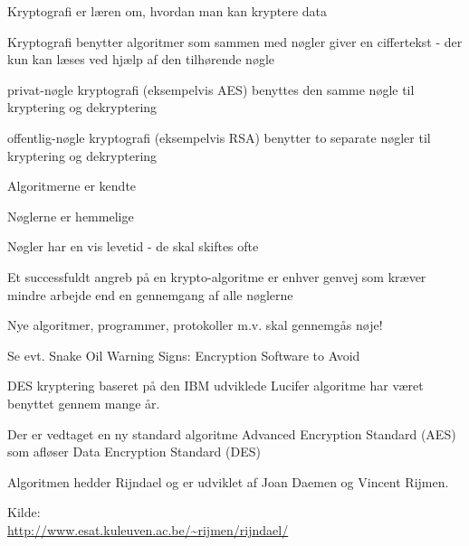

\begin{list1}
\item Kryptografi er læren om, hvordan man kan kryptere data
\item Kryptografi benytter algoritmer som sammen med nøgler giver en
  ciffertekst - der kun kan læses ved hjælp af den tilhørende nøgle
\item privat-nøgle kryptografi (eksempelvis AES) benyttes den samme
  nøgle til kryptering og dekryptering 
\item offentlig-nøgle kryptografi (eksempelvis RSA) benytter to
  separate nøgler til kryptering og dekryptering
\end{list1}



\begin{list1}
\item Algoritmerne er kendte
\item Nøglerne er hemmelige
\item Nøgler har en vis levetid - de skal skiftes ofte
\item Et successfuldt angreb på en krypto-algoritme er enhver genvej
  som kræver mindre arbejde end en gennemgang af alle nøglerne 
\item Nye algoritmer, programmer, protokoller m.v. skal gennemgås nøje!
\item Se evt. Snake Oil Warning Signs:
Encryption Software to Avoid 
\end{list1}



\begin{list1}
\item DES kryptering baseret på den IBM udviklede Lucifer algoritme
  har været benyttet gennem mange år. 
\item Der er vedtaget en ny standard algoritme Advanced Encryption
  Standard (AES) som afløser Data Encryption Standard (DES)
\item Algoritmen hedder Rijndael og er udviklet
af Joan Daemen og Vincent Rijmen.

\item Kilde:
\\
\href{http://www.esat.kuleuven.ac.be/~rijmen/rijndael/}
{http://www.esat.kuleuven.ac.be/\~{}rijmen/rijndael/}
\end{list1}


